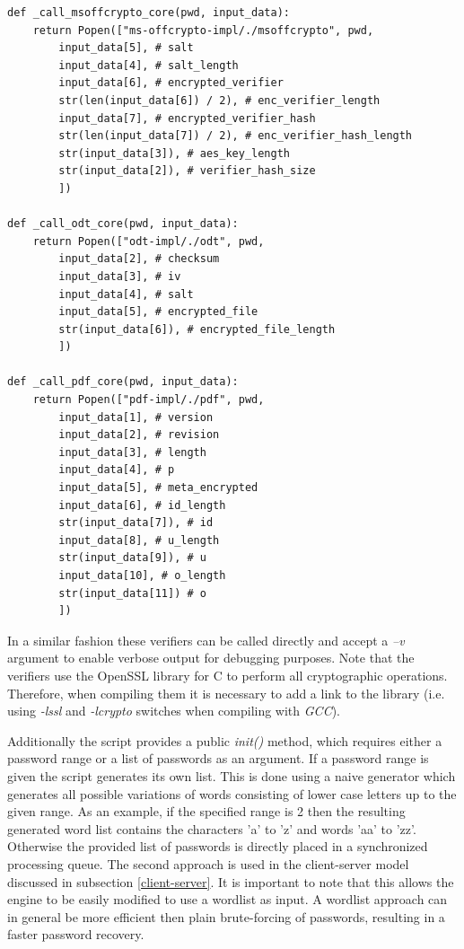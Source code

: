 \documentclass[11pt,oneside]{fithesis2}
\begin{document}
\begin{lstlisting}
def _call_msoffcrypto_core(pwd, input_data):
    return Popen(["ms-offcrypto-impl/./msoffcrypto", pwd, 
        input_data[5], # salt
        input_data[4], # salt_length
        input_data[6], # encrypted_verifier
        str(len(input_data[6]) / 2), # enc_verifier_length
        input_data[7], # encrypted_verifier_hash
        str(len(input_data[7]) / 2), # enc_verifier_hash_length
        str(input_data[3]), # aes_key_length
        str(input_data[2]), # verifier_hash_size
        ])

def _call_odt_core(pwd, input_data):
    return Popen(["odt-impl/./odt", pwd, 
        input_data[2], # checksum
        input_data[3], # iv
        input_data[4], # salt
        input_data[5], # encrypted_file
        str(input_data[6]), # encrypted_file_length
        ]) 

def _call_pdf_core(pwd, input_data):
    return Popen(["pdf-impl/./pdf", pwd, 
        input_data[1], # version
        input_data[2], # revision
        input_data[3], # length
        input_data[4], # p
        input_data[5], # meta_encrypted 
        input_data[6], # id_length 
        str(input_data[7]), # id
        input_data[8], # u_length 
        str(input_data[9]), # u 
        input_data[10], # o_length
        str(input_data[11]) # o
        ]) 
\end{lstlisting}


In a similar fashion these verifiers can be called directly and accept a \textit{–v} argument to enable verbose output for debugging purposes. Note that the verifiers use the OpenSSL library for C \cite{openssl} to perform all cryptographic operations. Therefore, when compiling them it is necessary to add a link to the library (i.e. using \textit{-lssl} and \textit{-lcrypto} switches when compiling with \textit{GCC}).

Additionally the script provides a public \textit{init()} method, which requires either a password range or a list of passwords as an argument. If a password range is given the script generates its own list. This is done using a naive generator which generates all possible variations of words consisting of lower case letters up to the given range. As an example, if the specified range is 2 then the resulting generated word list contains the characters 'a' to 'z' and words 'aa' to 'zz'. Otherwise the provided list of passwords is directly placed in a synchronized processing queue. The second approach is used in the client-server model discussed in subsection \ref{client-server}. It is important to note that this allows the engine to be easily modified to use a wordlist as input. A wordlist approach can in general be more efficient then plain brute-forcing of passwords, resulting in a faster password recovery.
\end{document}
